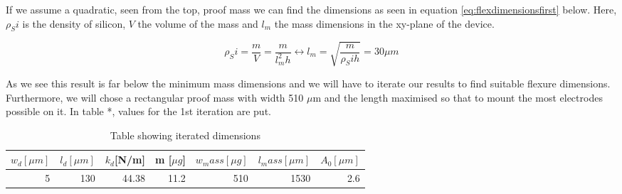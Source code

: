 \documentclass[12pt,a4paper,titlepage]{article}
\begin{document}
\begin{spacing}{1.1}
If we assume a quadratic, seen from the top, proof mass we can find the dimensions as seen in  equation \ref{eq:flexdimensionsfirst} below. Here, $\rho_Si$ is the density of silicon, $V$ the volume of the mass and $l_m$ the mass dimensions in the xy-plane of the device.

\begin{equation}
\rho_Si = \dfrac{m}{V} = \dfrac{m}{l_m^2 h} \leftrightarrow l_m = \sqrt{\dfrac{m}{\rho_Si h}} = 30 \mu m
\label{eq:flexdimensionsfirst}
\end{equation}

As we see this result is far below the minimum mass dimensions and we will have to iterate our results to find suitable flexure dimensions. Furthermore, we will chose a rectangular proof mass with width 510 $\mu$m and the length maximised so that to mount the most electrodes possible on it. In table *, values for the 1st iteration are put.

\begin{table}[htbp]
\caption{Table showing iterated dimensions}
\centering
\begin{tabular}{lllllll}
\toprule
$w_d [\mu m]$ & $l_d [\mu m]$ & $k_d$[N/m] & m [$\mu g$] & $w_mass [\mu g]$ & $l_mass [\mu m]$ & $A_0 [\mu m]$ \\ \midrule
\multicolumn{1}{r}{5} & \multicolumn{1}{r}{130} & \multicolumn{1}{r}{44.38} & \multicolumn{1}{r}{11.2} & \multicolumn{1}{r}{510} & \multicolumn{1}{r}{1530} & \multicolumn{1}{r}{2.6} \\ \bottomrule
\end{tabular}
\label{tab:1stiteration}
\end{table}


\end{spacing}
\printbibliography
\end{document}
